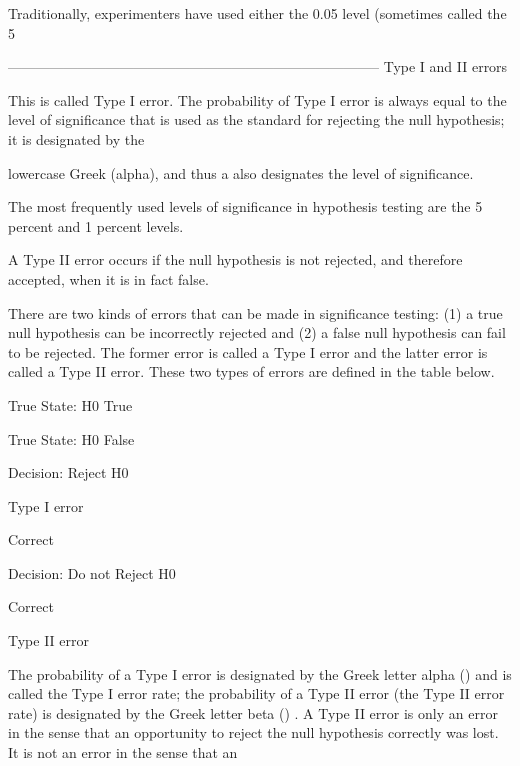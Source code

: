 Traditionally, experimenters have used either the 0.05 level (sometimes called the 5%



--------------------------------------------------------------------------------
Type I and II errors

This is called Type I error. The probability of Type I error is always equal to the level of significance that is used as the standard for rejecting the null hypothesis; it is designated by the

lowercase Greek (alpha), and thus a also designates the level of significance. 


The most frequently used levels of significance in hypothesis testing are the 5 percent and 1 percent levels.


A Type II error occurs if the null hypothesis is not rejected, and therefore accepted, when it is in fact false.


There are two kinds of errors that can be made in significance testing: (1) a true null hypothesis can be incorrectly rejected and (2) a false null hypothesis can fail to be rejected. The former error is called a Type I error and the latter error is called a Type II error. These two types of errors are defined in the table below. 













True State: H0 True
 

True State: H0 False
 



Decision: Reject H0
 

Type I error
 

Correct
 



Decision: Do not Reject H0
 

Correct 
 

Type II error
 



The probability of a Type I error is designated by the Greek letter alpha () and is called the Type I error rate; the probability of a Type II error (the Type II error rate) is designated by the Greek letter beta () . A Type II error is only an error in the sense that an opportunity to reject the null hypothesis correctly was lost. It is not an error in the sense that an

